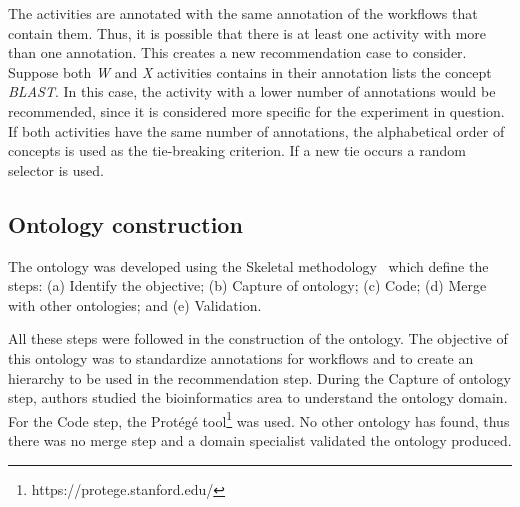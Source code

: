 \documentclass{RITA}
\begin{document}
The activities are annotated with the same annotation of the workflows that contain them. Thus, it is possible that there is at least one activity with more than one annotation. This creates a new recommendation case to consider. Suppose both \emph{W} and \emph{X} activities contains in their annotation lists the concept \emph{BLAST}. In this case, the activity with a lower number of annotations would be recommended, since it is considered more specific for the experiment in question. If both activities have the same number of annotations, the alphabetical order of concepts is used as the tie-breaking criterion. If a new tie occurs a random selector is used.

\subsection{Ontology construction}
The ontology was developed using the Skeletal methodology~\cite{Uschold95} which define the steps: (a) Identify the objective; (b) Capture of ontology; (c) Code; (d) Merge with other ontologies; and (e) Validation.

All these steps were followed in the construction of the ontology. The objective of this ontology was to standardize annotations for workflows and to create an hierarchy to be used in the recommendation step. During the Capture of ontology step, authors studied the bioinformatics area to understand the ontology domain. For the Code step, the Protégé tool\footnote{https://protege.stanford.edu/} was used. No other ontology has found, thus there was no merge step and a domain specialist validated the ontology produced.
\end{document}
